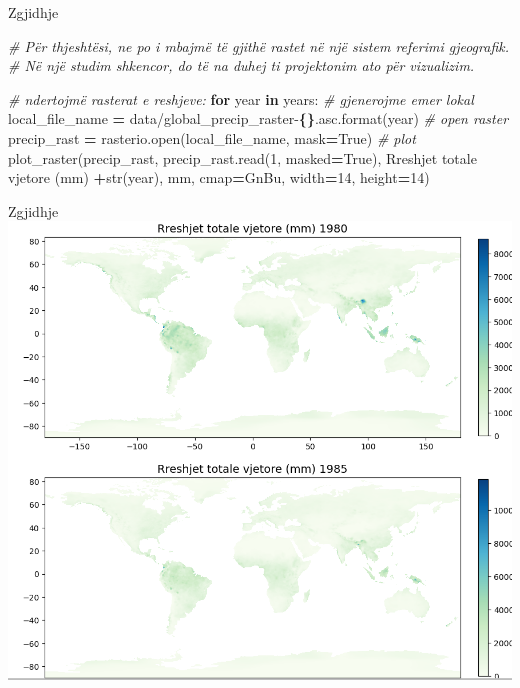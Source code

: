 \documentclass[
  ignorenonframetext,
]{beamer}
\newenvironment{Shaded}{\begin{snugshade}}{\end{snugshade}}
\newcommand{\BuiltInTok}[1]{#1}
\newcommand{\CommentTok}[1]{\textcolor[rgb]{0.56,0.35,0.01}{\textit{#1}}}
\newcommand{\ControlFlowTok}[1]{\textcolor[rgb]{0.13,0.29,0.53}{\textbf{#1}}}
\newcommand{\DecValTok}[1]{\textcolor[rgb]{0.00,0.00,0.81}{#1}}
\newcommand{\KeywordTok}[1]{\textcolor[rgb]{0.13,0.29,0.53}{\textbf{#1}}}
\newcommand{\NormalTok}[1]{#1}
\newcommand{\OperatorTok}[1]{\textcolor[rgb]{0.81,0.36,0.00}{\textbf{#1}}}
\newcommand{\SpecialCharTok}[1]{\textcolor[rgb]{0.81,0.36,0.00}{\textbf{#1}}}
\newcommand{\StringTok}[1]{\textcolor[rgb]{0.31,0.60,0.02}{#1}}
\newcommand{\VariableTok}[1]{\textcolor[rgb]{0.00,0.00,0.00}{#1}}
\begin{document}
\begin{frame}[fragile]{Zgjidhje}
\protect\hypertarget{zgjidhje-1}{}

\begin{Shaded}
\begin{Highlighting}[]
\CommentTok{\# Për thjeshtësi, ne po i mbajmë të gjithë rastet në një sistem referimi gjeografik.}
\CommentTok{\# Në një studim shkencor, do të na duhej t\textquotesingle{}i projektonim ato për vizualizim.}

\CommentTok{\# ndertojmë rasterat e reshjeve:}
\ControlFlowTok{for}\NormalTok{ year }\KeywordTok{in}\NormalTok{ years:}
    \CommentTok{\# gjenerojme emer lokal}
\NormalTok{    local\_file\_name }\OperatorTok{=} \StringTok{\textquotesingle{}data/global\_precip\_raster{-}}\SpecialCharTok{\{\}}\StringTok{.asc\textquotesingle{}}\NormalTok{.}\BuiltInTok{format}\NormalTok{(year)}
    \CommentTok{\# open raster}
\NormalTok{    precip\_rast }\OperatorTok{=}\NormalTok{ rasterio.}\BuiltInTok{open}\NormalTok{(local\_file\_name, mask}\OperatorTok{=}\VariableTok{True}\NormalTok{)}
    \CommentTok{\# plot}
\NormalTok{    plot\_raster(precip\_rast, precip\_rast.read(}\DecValTok{1}\NormalTok{, masked}\OperatorTok{=}\VariableTok{True}\NormalTok{), }
        \StringTok{\textquotesingle{}Rreshjet totale vjetore (mm) \textquotesingle{}}\OperatorTok{+}\BuiltInTok{str}\NormalTok{(year), }\StringTok{\textquotesingle{}mm\textquotesingle{}}\NormalTok{, }
\NormalTok{        cmap}\OperatorTok{=}\StringTok{\textquotesingle{}GnBu\textquotesingle{}}\NormalTok{, width}\OperatorTok{=}\DecValTok{14}\NormalTok{, height}\OperatorTok{=}\DecValTok{14}\NormalTok{)}
\end{Highlighting}
\end{Shaded}
\end{frame}

\begin{frame}{Zgjidhje}
\protect\hypertarget{zgjidhje-2}{}
\includegraphics{./Figs/reshtotvjet.png}
\end{frame}
\end{document}
